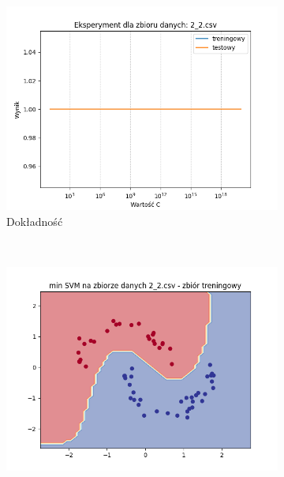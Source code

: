 \documentclass[12pt]{article}
\newcommand*{\subfigwidth}{0.24\textwidth}
\begin{document}
\begin{figure}[H]\centering
    \begin{subfigure}[t]{\subfigwidth}
        \includegraphics[width=\linewidth]{img/exp_3/svm/2_2/accuracy.png}
        \caption{Dokładność}
    \end{subfigure}
    \\
    \begin{subfigure}[t]{\subfigwidth}
        \includegraphics[width=\linewidth]{img/exp_3/svm/2_2/min/train_boundary.png}

\end{subfigure}
\end{figure}
\end{document}
